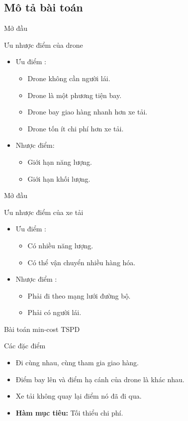 \documentclass[compress]{beamer}
\begin{document}
\subsection{Mô tả bài toán}
\begin{frame}{Mở đầu}
\begin{block}{Ưu nhược điểm của drone}
\begin{itemize}
\item Ưu điểm :
\begin{itemize}
\item Drone không cần người lái.
\item Drone là một phương tiện bay.
\item Drone bay giao hàng nhanh hơn xe tải.
\item Drone tốn ít chi phí hơn xe tải.
\end{itemize}
\item Nhược điểm: 
\begin{itemize}
\item Giới hạn năng lượng.
\item Giới hạn khối lượng.
\end{itemize}

\end{itemize}
\end{block}

\end{frame}
\begin{frame}{Mở đầu}
\begin{block}{Ưu nhược điểm của xe tải}
\begin{itemize}

\item Ưu điểm :
\begin{itemize}
\item Có nhiều năng lượng.
\item Có thể vận chuyển nhiều hàng hóa.
\end{itemize}
\item Nhược điểm :
\begin{itemize}
\item Phải đi theo mạng lưới đường bộ.
\item Phải có người lái.
\end{itemize}

\end{itemize}
\end{block}
\end{frame}
\begin{frame}{Bài toán min-cost TSPD}
\begin{block}{Các đặc điểm}
\begin{itemize}
\item Đi cùng nhau, cùng tham gia giao hàng.
\item Điểm bay lên và điểm hạ cánh của drone là khác nhau.
\item Xe tải không quay lại điểm nó đã đi qua.
\item \textbf{Hàm mục tiêu:} Tối thiểu chi phí.
\end{itemize}
\end{block}
\end{frame}
\end{document}
